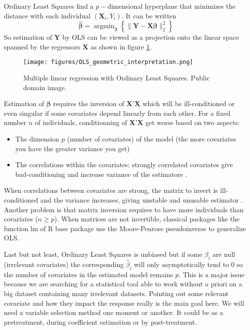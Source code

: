 \documentclass[12pt,a4paper]{report}
\begin{document}
	Ordinary Least Squares find a $p-$dimensional hyperplane that minimizes the distance with each individual $(\boldsymbol{X}_i,Y_i)$. It can be written
	\begin{equation}
		\boldsymbol{\hat{\beta}}=\operatorname{argmin}_{\boldsymbol{\beta}}\left\lbrace \parallel \boldsymbol{Y}-\boldsymbol{X\beta}\parallel_2^2 \right\rbrace
	\end{equation}
	So estimation of $\boldsymbol{Y}$ by OLS can be viewed as a projection onto the linear space spanned by the regressors $\boldsymbol{X}$ as shown in figure \ref{geomOLS}.%
	\begin{figure}[h!]
	\centering
	\texttt{[image: figures/OLS\_geometric\_interpretation.png]}
	\caption{Multiple linear regression with Ordinary Least Squares. Public domain image.} \label{geomOLS}
	\end{figure}
	
	Estimation of $\boldsymbol{\beta}$ requires the inversion of $\boldsymbol{X}'\boldsymbol{X}$ which will be ill-conditioned or even singular if some covariates depend linearly from each other. 
For a fixed number $n$ of individuals, conditionning of $\boldsymbol{X}'\boldsymbol{X}$ get worse based on two aspects: 
\begin{itemize}
	\item The dimension $p$ (number of covariates) of the model (the more covariates you have the greater variance you get)
	\item The correlations within the covariates: strongly correlated covariates give bad-conditioning and increase variance of the estimators .
\end{itemize}
	When correlations between covariates are strong, the matrix to invert is ill-conditioned and the variance increases, giving unstable and unusable estimator \cite{hoerl1970ridge}.
	Another problem is that matrix inversion requires to have more individuals than covariates ($n\geq p$).
	When matrices are not invertible, classical packages like the function lm of R base package \cite{packagebase} use the Moore-Penrose pseudoinverse \cite{PSP:2043984} to generalize OLS.
		
		
	Last but not least, Ordinary Least Squares is unbiased but if some $\beta_i$ are null (irrelevant covariates) the corresponding $\hat{\beta}_i$ will only asymptotically tend to 0 so the number of covariates in the estimated model remains $p$. This is a major issue because we are searching for a statistical tool able to work without a priori on a big dataset containing many irrelevant datasets. Pointing out some relevant covariate and how they impact the response really is the main goal here. We will need a variable selection method one moment or another. It could be as a pretreatment, during coefficient estimation or by post-treatment.
	
\end{document}

